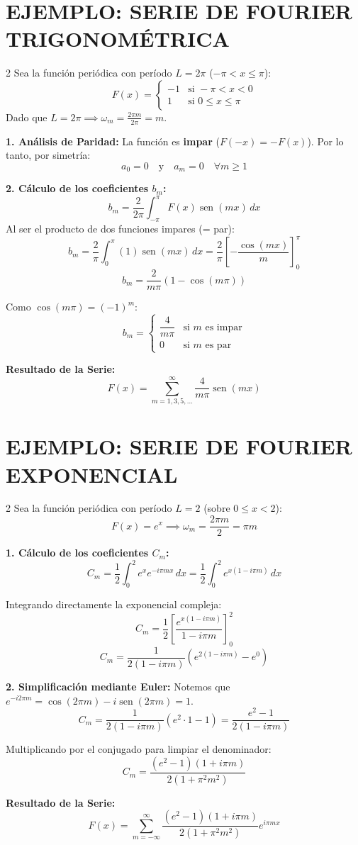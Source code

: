 \documentclass[10pt]{extarticle}
\begin{document}
\section*{EJEMPLO: SERIE DE FOURIER TRIGONOMÉTRICA}
\begin{multicols}{2}
Sea la función periódica con período $L = 2\pi$ ($-\pi < x \le \pi$):
$$F(x) = \begin{cases} -1 & \text{si } -\pi < x < 0 \\ 1 & \text{si } 0 \le x \le \pi \end{cases}$$
Dado que $L = 2\pi \implies \omega_m = \frac{2\pi m}{2\pi} = m$.

\textbf{1. Análisis de Paridad:}
La función es \textbf{impar} ($F(-x) = -F(x)$). Por lo tanto, por simetría:
$$a_0 = 0 \quad \text{y} \quad a_m = 0 \quad \forall m \ge 1$$

\textbf{2. Cálculo de los coeficientes $b_m$:}
$$b_m = \frac{2}{2\pi} \int_{-\pi}^{\pi} F(x) \operatorname{sen}(mx) \, dx$$
Al ser el producto de dos funciones impares (= par):
$$b_m = \frac{2}{\pi} \int_{0}^{\pi} (1) \operatorname{sen}(mx) \, dx = \frac{2}{\pi} \left[ -\frac{\cos(mx)}{m} \right]_{0}^{\pi}$$
$$b_m = \frac{2}{m\pi} (1 - \cos(m\pi))$$

Como $\cos(m\pi) = (-1)^m$:
$$b_m = \begin{cases} \dfrac{4}{m\pi} & \text{si $m$ es impar} \\ 0 & \text{si $m$ es par} \end{cases}$$

\textbf{Resultado de la Serie:}
$$F(x) = \sum_{m=1,3,5,\dots}^{\infty} \frac{4}{m\pi} \operatorname{sen}(mx)$$
\end{multicols}

\section*{EJEMPLO: SERIE DE FOURIER EXPONENCIAL}
\begin{multicols}{2}
Sea la función periódica con período $L = 2$ (sobre $0 \le x < 2$):
$$F(x) = e^x \implies \omega_m = \frac{2\pi m}{2} = \pi m$$

\textbf{1. Cálculo de los coeficientes $C_m$:}
$$C_m = \frac{1}{2} \int_{0}^{2} e^x e^{-i \pi m x} \, dx = \frac{1}{2} \int_{0}^{2} e^{x(1 - i\pi m)} \, dx$$

Integrando directamente la exponencial compleja:
$$C_m = \frac{1}{2} \left[ \frac{e^{x(1 - i\pi m)}}{1 - i\pi m} \right]_{0}^{2}$$
$$C_m = \frac{1}{2(1 - i\pi m)} \left( e^{2(1 - i\pi m)} - e^0 \right)$$

\textbf{2. Simplificación mediante Euler:}
Notemos que $e^{-i 2\pi m} = \cos(2\pi m) - i\operatorname{sen}(2\pi m) = 1$.
$$C_m = \frac{1}{2(1 - i\pi m)} \left( e^2 \cdot 1 - 1 \right) = \frac{e^2 - 1}{2(1 - i\pi m)}$$

Multiplicando por el conjugado para limpiar el denominador:
$$C_m = \frac{(e^2 - 1)(1 + i\pi m)}{2(1 + \pi^2 m^2)}$$

\textbf{Resultado de la Serie:}
$$F(x) = \sum_{m=-\infty}^{\infty} \frac{(e^2 - 1)(1 + i\pi m)}{2(1 + \pi^2 m^2)} e^{i \pi m x}$$
\end{multicols}
\end{document}
